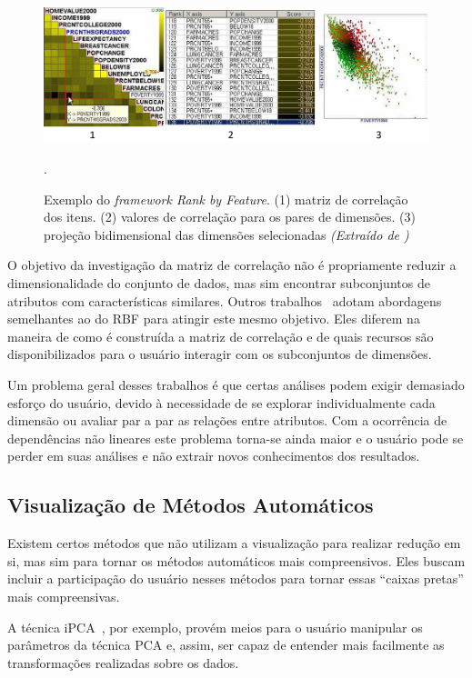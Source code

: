 \begin{figure}[h!]
    \centering
    \includegraphics[width=\textwidth]{images/rbf1.png}
    \caption[Rank by Feature Framework]{Exemplo do \emph{framework Rank by Feature}. (1) matriz de correlação dos itens. (2) valores de correlação para os pares de dimensões. (3) projeção bidimensional das dimensões selecionadas \emph{(Extraído de \cite{RBF2004})}}.
    \label{fig:rbf1}
\end{figure}

O objetivo da investigação da matriz de correlação não é propriamente reduzir a dimensionalidade do conjunto de dados, mas sim encontrar subconjuntos de atributos com características similares. Outros trabalhos~\cite{Guo2003,MacEachren2003,May2011,May2011ss} adotam abordagens semelhantes ao do RBF para atingir este mesmo objetivo. Eles diferem na maneira de como é construída a matriz de correlação e de quais recursos são disponibilizados para o usuário interagir com os subconjuntos de dimensões.

Um problema geral desses trabalhos é que certas análises podem exigir demasiado esforço do usuário, devido à necessidade de se explorar individualmente cada dimensão ou avaliar par a par as relações entre atributos. Com a ocorrência de dependências não lineares este problema torna-se ainda maior e o usuário pode se perder em suas análises e não extrair novos conhecimentos dos resultados.

\subsection{Visualização de Métodos Automáticos}

Existem certos métodos que não utilizam a visualização para realizar redução em si, mas sim para tornar os métodos automáticos mais compreensivos. Eles buscam incluir a participação do usuário nesses métodos para tornar essas ``caixas pretas'' mais compreensivas. 

A técnica iPCA~\cite{Jeong2009}, por exemplo, provém meios para o usuário manipular os parâmetros da técnica PCA e, assim, ser capaz de entender mais facilmente as transformações realizadas sobre os dados. 

